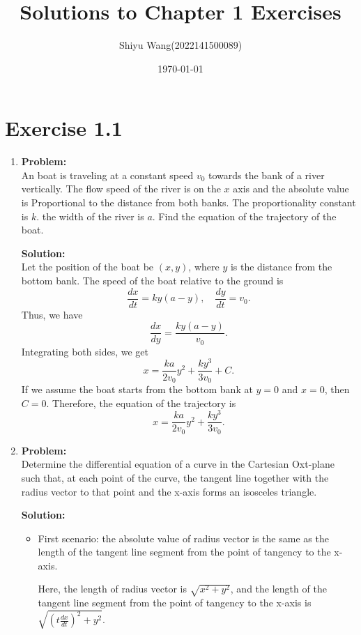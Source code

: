 \documentclass[12pt]{article}
\title{Solutions to Chapter 1 Exercises}
\author{Shiyu Wang(2022141500089)}
\date{\today}
\begin{document}
\maketitle

\section{Exercise 1.1}

\begin{enumerate}[label=\textbf{Exercise \arabic*:}]
    \item
    \textbf{Problem:} \\
    An boat is traveling at a constant speed $v_0$ towards the bank of a river vertically. The flow speed of the river is on the 
    $x$ axis and the absolute value is Proportional to the distance from both banks. The proportionality constant is $k$. 
    the width of the river is $a$. Find the equation of the trajectory of the boat.

    \textbf{Solution:} \\
    Let the position of the boat be $(x,y)$, where $y$ is the distance from the bottom bank. The speed of the boat relative to the ground is
    \[\frac{dx}{dt} = ky(a-y), \quad \frac{dy}{dt} = v_0.\]
    Thus, we have
    \[\frac{dx}{dy} = \frac{ky(a-y)}{v_0}.\]
    Integrating both sides, we get
    \[x = \frac{ka}{2v_0}y^2 +\frac{ky^3}{3v_0} + C.\]
    If we assume the boat starts from the bottom bank at $y=0$ and $x=0$, then $C=0$. Therefore, the equation of the trajectory is
    \[x = \frac{ka}{2v_0}y^2 +\frac{ky^3}{3v_0}.\]

    \item
    \textbf{Problem:} \\
    Determine the differential equation of a curve in the Cartesian Oxt-plane such that,
     at each point of the curve, the tangent line together with the radius vector 
     to that point and the x-axis forms an isosceles triangle.


    \textbf{Solution:} \\
    
    \begin{itemize}
        \item First scenario: the absolute value of radius vector is the same as the length 
        of the tangent line segment from the point of tangency to the x-axis.

        Here, the length of radius vector is $\sqrt{x^2 + y^2}$, and the length of the tangent 
        line segment from the point of tangency to the x-axis is $\sqrt{(t\frac{dx}{dt})^2+y^2}$.


\end{itemize}
\end{enumerate}
\end{document}
